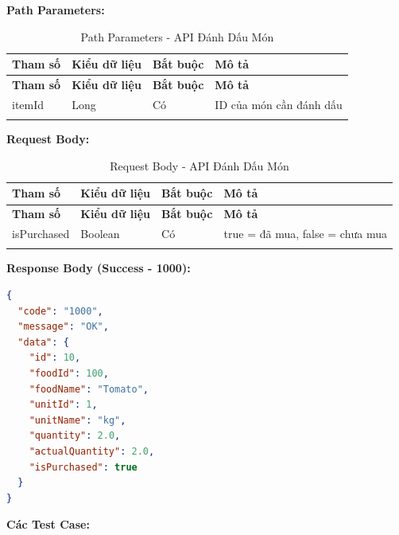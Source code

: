 \textbf{Path Parameters:}

\small
\begin{longtable}{|>{\raggedright\arraybackslash}p{3cm}|>{\raggedright\arraybackslash}p{2.5cm}|>{\raggedright\arraybackslash}p{2cm}|>{\raggedright\arraybackslash}p{6cm}|}
\hline
\textbf{Tham số} & \textbf{Kiểu dữ liệu} & \textbf{Bắt buộc} & \textbf{Mô tả} \\
\hline
\endfirsthead
\hline
\textbf{Tham số} & \textbf{Kiểu dữ liệu} & \textbf{Bắt buộc} & \textbf{Mô tả} \\
\hline
\endhead
itemId & Long & Có & ID của món cần đánh dấu \\
\hline
\caption{Path Parameters - API Đánh Dấu Món}
\end{longtable}

\textbf{Request Body:}

\small
\begin{longtable}{|>{\raggedright\arraybackslash}p{3cm}|>{\raggedright\arraybackslash}p{2.5cm}|>{\raggedright\arraybackslash}p{2cm}|>{\raggedright\arraybackslash}p{6cm}|}
\hline
\textbf{Tham số} & \textbf{Kiểu dữ liệu} & \textbf{Bắt buộc} & \textbf{Mô tả} \\
\hline
\endfirsthead
\hline
\textbf{Tham số} & \textbf{Kiểu dữ liệu} & \textbf{Bắt buộc} & \textbf{Mô tả} \\
\hline
\endhead
isPurchased & Boolean & Có & true = đã mua, false = chưa mua \\
\hline
\caption{Request Body - API Đánh Dấu Món}
\end{longtable}

\textbf{Response Body (Success - 1000):}

\begin{lstlisting}[language=json, caption=Response thanh cong API 1.11]
{
  "code": "1000",
  "message": "OK",
  "data": {
    "id": 10,
    "foodId": 100,
    "foodName": "Tomato",
    "unitId": 1,
    "unitName": "kg",
    "quantity": 2.0,
    "actualQuantity": 2.0,
    "isPurchased": true
  }
}
\end{lstlisting}

\textbf{Các Test Case:}

